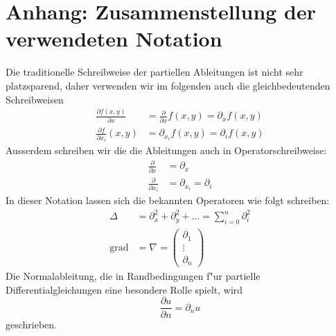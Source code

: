 \section{Anhang: Zusammenstellung der verwendeten Notation}
Die traditionelle Schreibweise der partiellen Ableitungen ist nicht sehr platzsparend,
daher verwenden wir im folgenden auch die gleichbedeutenden Schreibweisen
\begin{align*}
\frac{\partial f(x,y)}{\partial x}
&=\frac{\partial}{\partial x}f(x,y)
=\partial_x f(x,y)\\
\frac{\partial f}{\partial x_i}(x,y)
&=\partial_{x_i}f(x,y)=\partial_if(x,y)
\end{align*}
Ausserdem schreiben wir die die Ableitungen auch in Operatorschreibweise:
\begin{align*}
\frac{\partial}{\partial x}
&=
\partial_x\\
\frac{\partial}{\partial x_i}
&=
\partial_{x_i}
=\partial_i
\end{align*}
In dieser Notation lassen sich die bekannten Operatoren wie folgt schreiben:
\begin{align*}
\Delta &=\partial_x^2+\partial_y^2+\dots=\sum_{i=0}^n\partial_i^2\\
\operatorname{grad}&=\nabla=\begin{pmatrix}\partial_1\\\vdots\\\partial_n\end{pmatrix}
\end{align*}
Die Normalableitung, die in Randbedingungen f"ur partielle Differentialgleichungen
eine besondere Rolle spielt, wird 
\[
\frac{\partial u}{\partial n}=\partial_nu
\]
geschrieben.

